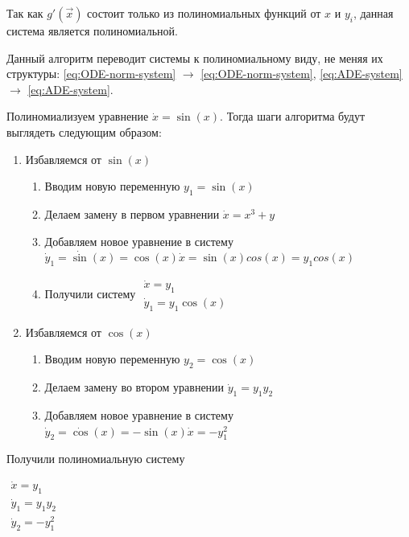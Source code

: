 Так как $g'(\vec x)$ состоит только из полиномиальных функций от $x$ и $y_i$, данная система является полиномиальной.

Данный алгоритм переводит системы к полиномиальному виду, не меняя их структуры: \eqref{eq:ODE-norm-system} $\longrightarrow$ \eqref{eq:ODE-norm-system}, \eqref{eq:ADE-system} $\longrightarrow$ \eqref{eq:ADE-system}.

\begin{example}
    Полиномиализуем уравнение $\dot x = \sin(x)$. Тогда шаги алгоритма будут выглядеть следующим образом:
    \begin{enumerate}
        \item Избавляемся от $\sin(x)$
        \begin{enumerate}
            \item Вводим новую переменную $y_1 =  \sin(x)$
            \item Делаем замену в первом уравнении $\dot x = x^3 + y$
            \item Добавляем новое уравнение в систему $\dot y_1 = \dot {\sin}(x) = \cos(x) \dot x = \sin(x) cos(x) = y_1 cos(x)$
            \item Получили систему $\begin{array}{lcl} \dot x = y_1\\ \dot y_1 = y_1 \cos(x) \end{array}$
        \end{enumerate}
        \item Избавляемся от $\cos(x)$
        \begin{enumerate}
            \item Вводим новую переменную $y_2 =  \cos(x)$
            \item Делаем замену во втором уравнении $\dot y_1 = y_1 y_2$
            \item Добавляем новое уравнение в систему $\dot y_2 = \dot {\cos}(x) = -\sin(x) \dot x = -y_1^2$
        \end{enumerate}
    \end{enumerate}
    
    Получили полиномиальную систему
    
    $\begin{array}{lcl}
        \dot x = y_1\\
        \dot y_1 = y_1 y_2\\
        \dot y_2 = -y_1^2
    \end{array}$
\end{example}



